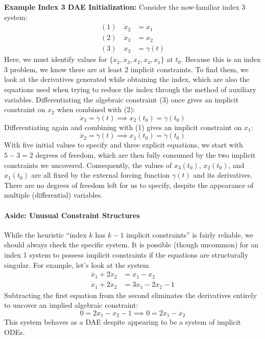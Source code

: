 \begin{exampleBox} \textbf{Example Index 3 DAE Initialization:}  Consider the now-familiar index 3 system:
\begin{equation}
    \begin{aligned}
        (1) \quad \dot{x}_2 &= x_1 \\
        (2) \quad \dot{x}_3 &= x_2 \\
        (3) \quad x_3 &= \gamma(t)
    \end{aligned}
\end{equation}
Here, we must identify values for $\{\dot{x}_2, \dot{x}_3, x_2, x_3, x_1\}$ at $t_0$. Because this is an index 3 problem, we know there are at least 2 implicit constraints. To find them, we look at the derivatives generated while obtaining the index, which are also the equations used when trying to reduce the index through the method of auxiliary variables. Differentiating the algebraic constraint (3) once gives an implicit constraint on $x_2$ when combined with (2):
\begin{equation}
    \dot{x}_3 = \dot{\gamma}(t) \implies x_2(t_0) = \dot{\gamma}(t_0)
\end{equation}
Differentiating again and combining with (1) gives an implicit constraint on $x_1$:
\begin{equation}
    \dot{x}_2 = \ddot{\gamma}(t) \implies x_1(t_0) = \ddot{\gamma}(t_0)
\end{equation}
With five initial values to specify and three explicit equations, we start with $5 - 3 = 2$ degrees of freedom, which are then fully consumed by the two implicit constraints we uncovered. Consequently, the values of $x_3(t_0)$, $x_2(t_0)$, and $x_1(t_0)$ are all fixed by the external forcing function $\gamma(t)$ and its derivatives. There are no degrees of freedom left for us to specify, despite the appearance of multiple (differential) variables.
\end{exampleBox}

\paragraph*{Aside: Unusual Constraint Structures}

While the heuristic ``index $k$ has $k-1$ implicit constraints'' is fairly reliable, we should always check the specific system. It is possible (though uncommon) for an index 1 system to possess implicit constraints if the equations are structurally singular. For example, let's look at the system
\begin{equation}
    \begin{aligned}
        \dot{x}_1 + 2\dot{x}_2 &= x_1 - x_2 \\
        \dot{x}_1 + 2\dot{x}_2 &= 3x_1 - 2x_2 - 1
    \end{aligned}
\end{equation}
Subtracting the first equation from the second eliminates the derivatives entirely to uncover an implied algebraic constraint:
\begin{equation}
    0 = 2x_1 - x_2 - 1 \implies 0 = 2\dot{x}_1 - \dot{x}_2
\end{equation}
This system behaves as a DAE despite appearing to be a system of implicit ODEs.


